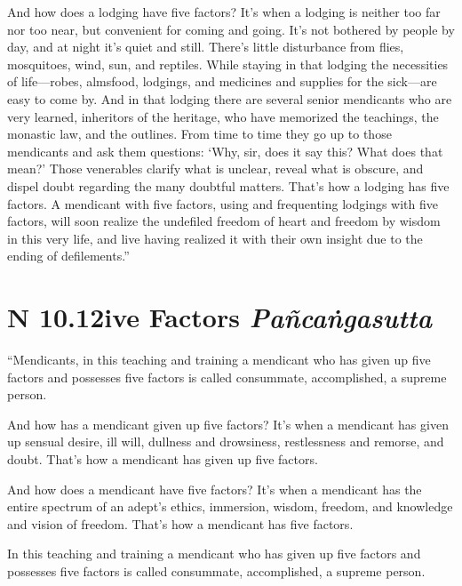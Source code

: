 \documentclass[12pt,openany]{book}%
\newcommand*{\suttatitleacronym}[1]{\smaller[2]{#1}\vspace*{.3em}}
\newcommand*{\suttatitletranslation}[1]{\linebreak{#1}}
\newcommand*{\suttatitleroot}[1]{\linebreak\smaller[2]\itshape{#1}}
\newcommand*{\tocacronym}[1]{\hspace*{-3.3em}{#1}\quad}
\newcommand*{\toctranslation}[1]{#1}
\newcommand*{\tocroot}[1]{(\textit{#1})}
\begin{document}
And how does a lodging have five factors? It’s when a lodging is neither too far nor too near, but convenient for coming and going. It’s not bothered by people by day, and at night it’s quiet and still. There’s little disturbance from flies, mosquitoes, wind, sun, and reptiles. While staying in that lodging the necessities of life—robes, almsfood, lodgings, and medicines and supplies for the sick—are easy to come by. And in that lodging there are several senior mendicants who are very learned, inheritors of the heritage, who have memorized the teachings, the monastic law, and the outlines. From time to time they go up to those mendicants and ask them questions: ‘Why, sir, does it say this? What does that mean?’ Those venerables clarify what is unclear, reveal what is obscure, and dispel doubt regarding the many doubtful matters. That’s how a lodging has five factors. A mendicant with five factors, using and frequenting lodgings with five factors, will soon realize the undefiled freedom of heart and freedom by wisdom in this very life, and live having realized it with their own insight due to the ending of defilements.” 

%
\section*{{\suttatitleacronym AN 10.12}{\suttatitletranslation Five Factors }{\suttatitleroot Pañcaṅgasutta}}
\addcontentsline{toc}{section}{\tocacronym{AN 10.12} \toctranslation{Five Factors } \tocroot{Pañcaṅgasutta}}

“Mendicants, in this teaching and training a mendicant who has given up five factors and possesses five factors is called consummate, accomplished, a supreme person. 

And how has a mendicant given up five factors? It’s when a mendicant has given up sensual desire, ill will, dullness and drowsiness, restlessness and remorse, and doubt. That’s how a mendicant has given up five factors. 

And how does a mendicant have five factors? It’s when a mendicant has the entire spectrum of an adept’s ethics, immersion, wisdom, freedom, and knowledge and vision of freedom. That’s how a mendicant has five factors. 

In this teaching and training a mendicant who has given up five factors and possesses five factors is called consummate, accomplished, a supreme person. 
\end{document}
